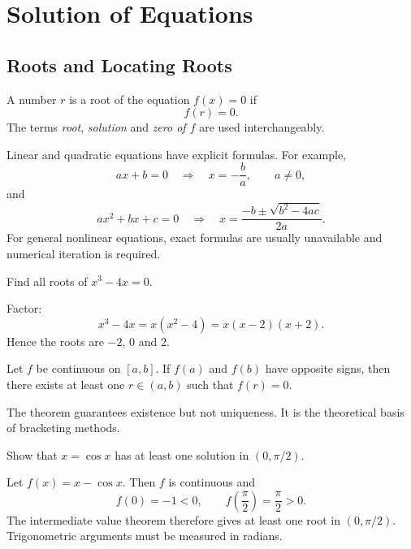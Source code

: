 \chapter{Solution of Equations}

\section{Roots and Locating Roots}

\begin{definition}
A number $r$ is a root of the equation $f(x)=0$ if
\[
 f(r)=0.
\]
The terms \emph{root}, \emph{solution} and \emph{zero of $f$} are used interchangeably.
\end{definition}

Linear and quadratic equations have explicit formulas.  For example,
\[
 ax+b=0\quad\Longrightarrow\quad x=-\frac ba,
 \qquad a\ne0,
\]
and
\[
 ax^2+bx+c=0
 \quad\Longrightarrow\quad
 x=\frac{-b\pm\sqrt{b^2-4ac}}{2a}.
\]
For general nonlinear equations, exact formulas are usually unavailable and numerical iteration is required.

\begin{example}
Find all roots of $x^3-4x=0$.
\end{example}

\begin{solution}[2.2cm]
Factor:
\[
 x^3-4x=x(x^2-4)=x(x-2)(x+2).
\]
Hence the roots are $-2$, $0$ and $2$.
\end{solution}

\begin{theorem}
Let $f$ be continuous on $[a,b]$.  If $f(a)$ and $f(b)$ have opposite signs, then there exists at least one $r\in(a,b)$ such that $f(r)=0$.
\end{theorem}

The theorem guarantees existence but not uniqueness.  It is the theoretical basis of bracketing methods.

\begin{example}
Show that $x=\cos x$ has at least one solution in $(0,\pi/2)$.
\end{example}

\begin{solution}[2.8cm]
Let $f(x)=x-\cos x$.  Then $f$ is continuous and
\[
 f(0)=-1<0,
 \qquad
 f\left(\frac\pi2\right)=\frac\pi2>0.
\]
The intermediate value theorem therefore gives at least one root in $(0,\pi/2)$.  Trigonometric arguments must be measured in radians.
\end{solution}

